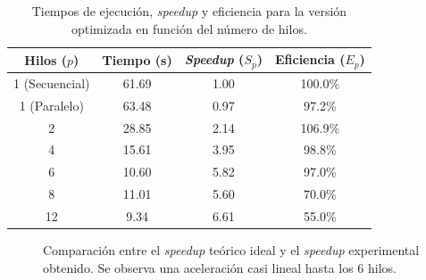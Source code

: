 \documentclass[12pt]{article}
\begin{document}
\begin{enumerate}
\begin{table}[htbp]
\centering
\caption{Tiempos de ejecución, \textit{speedup} y eficiencia para la versión optimizada en función del número de hilos.}
\label{tab:tiempos_openmp}
\begin{tabular}{cccc}
\toprule
\textbf{Hilos ($p$)} & \textbf{Tiempo (s)} & \textbf{\textit{Speedup} ($S_p$)} & \textbf{Eficiencia ($E_p$)} \\
\midrule
1 (Secuencial) & 61.69 & 1.00 & 100.0\% \\
1 (Paralelo)   & 63.48 & 0.97 & 97.2\%  \\
2              & 28.85 & 2.14 & 106.9\% \\
4              & 15.61 & 3.95 & 98.8\%  \\
6              & 10.60 & 5.82 & 97.0\%  \\
8              & 11.01 & 5.60 & 70.0\%  \\
12             & 9.34  & 6.61 & 55.0\%  \\
\bottomrule
\end{tabular}
\end{table}

\begin{figure}[htbp]
\centering
{}
\caption{Comparación entre el \textit{speedup} teórico ideal y el \textit{speedup} experimental obtenido. Se observa una aceleración casi lineal hasta los 6 hilos. }
\label{fig:speedup_openmp}
\end{figure}




\end{enumerate}
\end{document}
